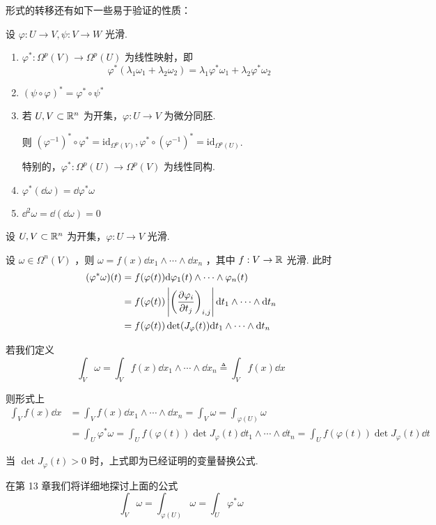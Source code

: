 形式的转移还有如下一些易于验证的性质：

\begin{property}
    设 $\varphi:U\to V,\psi:V\to W$ 光滑.

    \begin{enumerate}
        \item $\varphi^*:\Omega^p(V)\to\Omega^p(U)$ 为线性映射，即
$$
\varphi^*(\lambda_1\omega_1+\lambda_2\omega_2)=\lambda_1\varphi^*\omega_1+\lambda_2\varphi^*\omega_2
$$

        \item $(\psi\circ\varphi)^*=\varphi^*\circ\psi^*$
        
        \item 若 $U,V\subset\mathbb{R}^n$ 为开集，$\varphi:U\to V$ 为微分同胚.
        
        则 $(\varphi^{-1})^*\circ\varphi^*=\mathrm{id}_{\Omega^p(V)},\varphi^*\circ(\varphi^{-1})^*=\mathrm{id}_{\Omega^p(U)}$.

        特别的，$\varphi^*:\Omega^p(U)\to\Omega^p(V)$ 为线性同构.

        \item $\varphi^*(\dd\omega)=\dd\varphi^*\omega$

        \item $\dd^2\omega=\dd(\dd\omega)=0$
    \end{enumerate}
\end{property}

\begin{example}
    设 $U,V\subset\mathbb{R}^n$ 为开集，$\varphi:U\to V$ 光滑.

    设 $\omega\in\Omega^n(V)$ ，则 $\omega=f(x)\dd x_1\wedge\cdots\wedge\dd x_n$ ，其中 $f:V\to\mathbb{R}$ 光滑. 此时
$$
\begin{aligned}
(\varphi^*\omega)(t)&=f(\varphi(t))\mathrm{d}\varphi_1(t)\wedge\cdots\wedge\varphi_n(t)\\
&=f(\varphi(t))\left\lvert\left(\frac{\partial{\varphi_i}}{\partial{t_j}}\right)_{i,j}\right\rvert\mathrm{d} t_1\wedge\cdots\wedge\mathrm{d} t_n\\
&=f(\varphi(t))\det(J_\varphi(t))\mathrm{d} t_1\wedge\cdots\wedge\mathrm{d} t_n
\end{aligned}
$$

    若我们定义
$$
\int_V\omega=\int_Vf(x)\dd x_1\wedge\cdots\wedge\dd x_n\triangleq\int_Vf(x)\dd x
$$

    则形式上
$$
\begin{aligned}
\int_Vf(x)\dd x&=\int_Vf(x)\dd x_1\wedge\cdots\wedge\dd x_n=\int_V\omega=\int_{\varphi(U)}\omega\\
&=\int_U\varphi^*\omega=\int_Uf(\varphi(t))\det J_\varphi(t)\dd t_1\wedge\cdots\wedge\dd t_n=\int_Uf(\varphi(t))\det J_\varphi(t)\dd t
\end{aligned}
$$

    当 $\det J_\varphi(t)>0$ 时，上式即为已经证明的变量替换公式.

    在第 13 章我们将详细地探讨上面的公式
$$
\int_V\omega=\int_{\varphi(U)}\omega=\int_U\varphi^*\omega
$$
\end{example}


